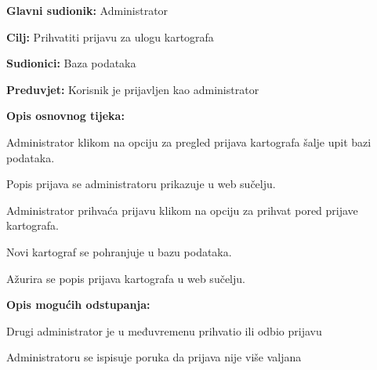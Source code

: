 				\noindent {}
				\begin{packed_item}
					
					\item \textbf{Glavni sudionik: }Administrator
					\item  \textbf{Cilj:} Prihvatiti prijavu za ulogu kartografa
					\item  \textbf{Sudionici:} Baza podataka
					\item  \textbf{Preduvjet:} Korisnik je prijavljen kao administrator
					\item  \textbf{Opis osnovnog tijeka:}
					
					\item[] \begin{packed_enum}
						
						\item Administrator klikom na opciju za pregled prijava kartografa šalje upit bazi podataka.
						\item Popis prijava se administratoru prikazuje u web sučelju.
						\item Administrator prihvaća prijavu klikom na opciju za prihvat pored prijave kartografa.
						\item Novi kartograf se pohranjuje u bazu podataka.
						\item Ažurira se popis prijava kartografa u web sučelju.
					\end{packed_enum}
					
					\item  \textbf{Opis mogućih odstupanja:}
					
					\item[] \begin{packed_item}

						
						\item[3.a] Drugi administrator je u međuvremenu prihvatio ili odbio prijavu
						\item[] \begin{packed_enum}
							
							\item Administratoru se ispisuje poruka da prijava nije više valjana
							
						\end{packed_enum}
						
					\end{packed_item}
				\end{packed_item}
				
